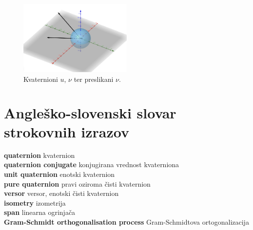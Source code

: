 \documentclass[a4paper,12pt]{article}
\newcommand{\geslo}[2]{\noindent\textbf{#1} \quad \hangindent=1cm #2 \\}
\begin{document}
\begin{figure}[ht]
   \centering
   \includegraphics[width = 0.5\textwidth]{vektorji_nu_nu2}
   \caption{Kvaternioni $u$, $\nu$ ter preslikani $\nu$.}
\end{figure}


\newpage


\section*{Angleško-slovenski slovar strokovnih izrazov}

\geslo{quaternion}{kvaternion}

\geslo{quaternion conjugate}{konjugirana vrednost kvaterniona}

\geslo{unit quaternion}{enotski kvaternion}

\geslo{pure quaternion}{pravi oziroma čisti kvaternion}

\geslo{versor}{versor, enotski čisti kvaternion}

\geslo{isometry}{izometrija}

\geslo{span}{linearna ogrinjača}

\geslo{Gram-Schmidt orthogonalisation process}{Gram-Schmidtova ortogonalizacija}




\end{document}
